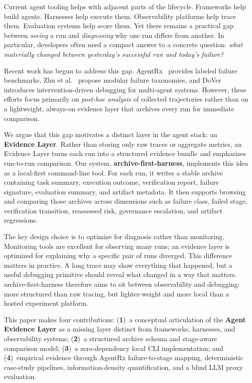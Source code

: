 \documentclass[11pt]{article}
\begin{document}
Current agent tooling helps with adjacent parts of the lifecycle. Frameworks help build agents. Harnesses help execute them. Observability platforms help trace them. Evaluation systems help score them. Yet there remains a practical gap between \emph{seeing} a run and \emph{diagnosing} why one run differs from another. In particular, developers often need a compact answer to a concrete question: \emph{what materially changed between yesterday's successful run and today's failure?}

Recent work has begun to address this gap. AgentRx~\cite{barke2026agentrx} provides labeled failure benchmarks, Zhu et al.~\cite{zhu2025agentdebug} propose modular failure taxonomies, and DoVer~\cite{ma2025dover} introduces intervention-driven debugging for multi-agent systems. However, these efforts focus primarily on \emph{post-hoc analysis} of collected trajectories rather than on a lightweight, always-on evidence layer that archives every run for immediate comparison.

We argue that this gap motivates a distinct layer in the agent stack: an \textbf{Evidence Layer}. Rather than storing only raw traces or aggregate metrics, an Evidence Layer turns each run into a structured evidence bundle and emphasizes run-to-run comparison. Our system, \textbf{archive-first-harness}, implements this idea as a local-first command-line tool. For each run, it writes a stable archive containing task summary, execution outcome, verification report, failure signature, evaluation summary, and artifact metadata. It then supports browsing and comparing those archives across dimensions such as failure class, failed stage, verification transition, reassessed risk, governance escalation, and artifact regressions.

The key design choice is to optimize for diagnosis rather than monitoring. Monitoring tools are excellent for observing many runs; an evidence layer is optimized for explaining why a specific pair of runs diverged. This difference matters in practice. A long trace may show everything that happened, but a useful debugging primitive should reveal what changed in a way that matters. archive-first-harness therefore aims to sit between observability and debugging: more structured than raw tracing, but lighter-weight and more local than a hosted experiment platform.

This paper makes four contributions: (\textbf{1})~a conceptual articulation of the \textbf{Agent Evidence Layer} as a missing layer distinct from frameworks, harnesses, and observability systems; (\textbf{2})~a structured archive schema and stage-aware comparison model; (\textbf{3})~a zero-dependency local CLI implementation; and (\textbf{4})~empirical evidence through AgentRx failure-to-stage mapping, deterministic case-study pipelines, information-density quantification, and a blind LLM proxy evaluation.
\end{document}

